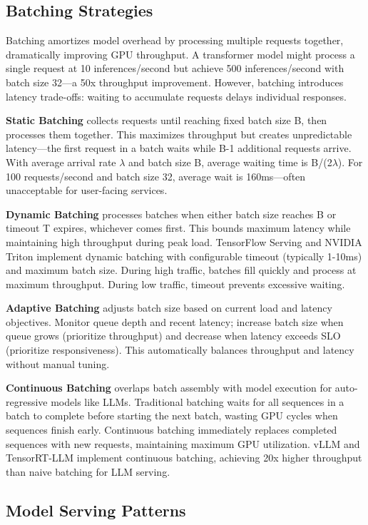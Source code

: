 \subsection{Batching Strategies}

Batching amortizes model overhead by processing multiple requests together, dramatically improving GPU throughput. A transformer model might process a single request at 10 inferences/second but achieve 500 inferences/second with batch size 32---a 50x throughput improvement. However, batching introduces latency trade-offs: waiting to accumulate requests delays individual responses.

\textbf{Static Batching} collects requests until reaching fixed batch size B, then processes them together. This maximizes throughput but creates unpredictable latency---the first request in a batch waits while B-1 additional requests arrive. With average arrival rate $\lambda$ and batch size B, average waiting time is B/(2$\lambda$). For 100 requests/second and batch size 32, average wait is 160ms---often unacceptable for user-facing services.

\textbf{Dynamic Batching} processes batches when either batch size reaches B or timeout T expires, whichever comes first. This bounds maximum latency while maintaining high throughput during peak load. TensorFlow Serving and NVIDIA Triton implement dynamic batching with configurable timeout (typically 1-10ms) and maximum batch size. During high traffic, batches fill quickly and process at maximum throughput. During low traffic, timeout prevents excessive waiting.

\textbf{Adaptive Batching} adjusts batch size based on current load and latency objectives. Monitor queue depth and recent latency; increase batch size when queue grows (prioritize throughput) and decrease when latency exceeds SLO (prioritize responsiveness). This automatically balances throughput and latency without manual tuning.

\textbf{Continuous Batching} overlaps batch assembly with model execution for auto-regressive models like LLMs. Traditional batching waits for all sequences in a batch to complete before starting the next batch, wasting GPU cycles when sequences finish early. Continuous batching immediately replaces completed sequences with new requests, maintaining maximum GPU utilization. vLLM and TensorRT-LLM implement continuous batching, achieving 20x higher throughput than naive batching for LLM serving.

\subsection{Model Serving Patterns}

